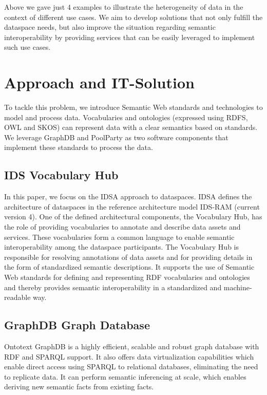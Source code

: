 \documentclass[
  super,
  preprint,
  3p]{elsarticle}
\begin{document}
Above we gave just 4 examples to illustrate the heterogeneity of data in
the context of different use cases. We aim to develop solutions that not
only fulfill the dataspace needs, but also improve the situation
regarding semantic interoperability by providing services that can be
easily leveraged to implement such use cases.

\section{Approach and IT-Solution}\label{approach-and-it-solution}

To tackle this problem, we introduce Semantic Web standards and
technologies to model and process data. Vocabularies and ontologies
(expressed using RDFS, OWL and SKOS) can represent data with a clear
semantics based on standards. We leverage GraphDB and PoolParty as two
software components that implement these standards to process the data.

\subsection{IDS Vocabulary Hub}\label{ids-vocabulary-hub}

In this paper, we focus on the IDSA approach to dataspaces. IDSA defines
the architecture of dataspaces in the reference architecture model
IDS-RAM (current version 4). One of the defined architectural
components, the Vocabulary Hub, has the role of providing vocabularies
to annotate and describe data assets and services. These vocabularies
form a common language to enable semantic interoperability among the
dataspace participants. The Vocabulary Hub is responsible for resolving
annotations of data assets and for providing details in the form of
standardized semantic descriptions. It supports the use of Semantic Web
standards for defining and representing RDF vocabularies and ontologies
and thereby provides semantic interoperability in a standardized and
machine-readable way.

\subsection{GraphDB Graph Database}\label{graphdb-graph-database}

Ontotext GraphDB is a highly efficient, scalable and robust graph
database with RDF and SPARQL support. It also offers data virtualization
capabilities which enable direct access using SPARQL to relational
databases, eliminating the need to replicate data. It can perform
semantic inferencing at scale, which enables deriving new semantic facts
from existing facts.
\end{document}
